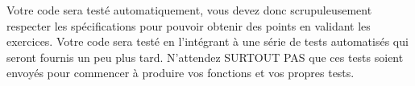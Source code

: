 


\noindent Votre code sera testé automatiquement, vous devez donc scrupuleusement respecter les spécifications pour pouvoir obtenir des points en validant les exercices.
Votre code sera testé en l'intégrant à une série de tests automatisés qui seront fournis un peu plus tard.
N'attendez SURTOUT PAS que ces tests soient envoyés pour commencer à produire vos fonctions et vos propres tests.

%
%
%
%
%
%

\bigskip

